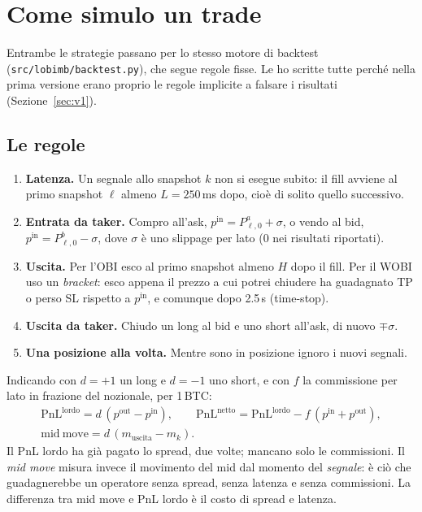 \documentclass[a4paper,11pt]{article}
\newcommand{\code}[1]{\texttt{#1}}
\begin{document}
\section{Come simulo un trade}
\label{sec:esecuzione}

Entrambe le strategie passano per lo stesso motore di backtest (\code{src/lobimb/backtest.py}),
che segue regole fisse. Le ho scritte tutte perché nella prima versione erano proprio le regole
implicite a falsare i risultati (Sezione~\ref{sec:v1}).

\subsection{Le regole}

\begin{enumerate}[leftmargin=*]
  \item \textbf{Latenza.} Un segnale allo snapshot $k$ non si esegue subito: il fill avviene al
        primo snapshot $\ell$ almeno $L = 250$\,ms dopo, cioè di solito quello successivo.
  \item \textbf{Entrata da taker.} Compro all'ask, $p^{\mathrm{in}} = P^a_{\ell,0} + \sigma$,
        o vendo al bid, $p^{\mathrm{in}} = P^b_{\ell,0} - \sigma$, dove $\sigma$ è uno
        slippage per lato (0 nei risultati riportati).
  \item \textbf{Uscita.} Per l'OBI esco al primo snapshot almeno $H$ dopo il fill. Per il
        WOBI uso un \emph{bracket}: esco appena il prezzo a cui potrei chiudere ha guadagnato
        TP o perso SL rispetto a $p^{\mathrm{in}}$, e comunque dopo 2.5\,s (time-stop).
  \item \textbf{Uscita da taker.} Chiudo un long al bid e uno short all'ask, di nuovo
        $\mp\sigma$.
  \item \textbf{Una posizione alla volta.} Mentre sono in posizione ignoro i nuovi segnali.
\end{enumerate}

\noindent Indicando con $d = +1$ un long e $d = -1$ uno short, e con $f$ la commissione per
lato in frazione del nozionale, per 1\,BTC:
\begin{gather}
  \mathrm{PnL}^{\mathrm{lordo}} = d\,(p^{\mathrm{out}} - p^{\mathrm{in}}), \qquad
  \mathrm{PnL}^{\mathrm{netto}} = \mathrm{PnL}^{\mathrm{lordo}}
      - f\,(p^{\mathrm{in}} + p^{\mathrm{out}}), \\
  \mathrm{mid\ move} = d\,(m_{\mathrm{uscita}} - m_k).
\end{gather}
Il PnL lordo ha già pagato lo spread, due volte; mancano solo le commissioni. Il \emph{mid
move} misura invece il movimento del mid dal momento del \emph{segnale}: è ciò che guadagnerebbe
un operatore senza spread, senza latenza e senza commissioni. La differenza tra mid move e PnL
lordo è il costo di spread e latenza.
\end{document}
